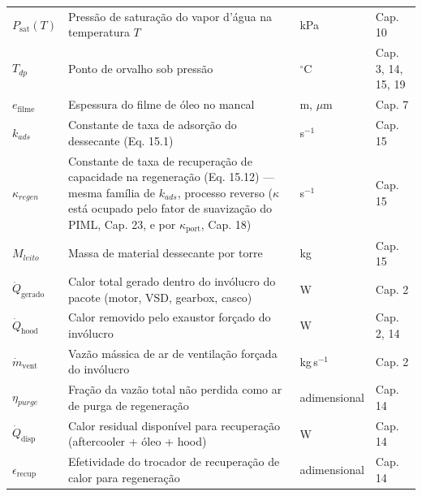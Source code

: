 \documentclass[12pt,a4paper]{article}
\numberwithin{equation}{section}
\numberwithin{table}{section}
\numberwithin{figure}{section}
\begin{document}
{\begin{longtable}{>{\raggedright\arraybackslash}p{2.8cm} >{\raggedright\arraybackslash}p{5.3cm} >{\raggedright\arraybackslash}p{2.1cm} >{\raggedright\arraybackslash}p{4.2cm}}
	$P_{\text{sat}}(T)$ & Pressão de saturação do vapor d'água na temperatura $T$ & kPa & Cap. 10 \\
	$T_{dp}$ & Ponto de orvalho sob pressão & $^{\circ}$C & Cap. 3, 14, 15, 19 \\
	$e_{\text{filme}}$\dag & Espessura do filme de óleo no mancal & m, $\mu$m & Cap. 7 \\
	$k_{ads}$\dag & Constante de taxa de adsorção do dessecante (Eq. 15.1) & s$^{-1}$ & Cap. 15 \\
	$\kappa_{regen}$\dag & Constante de taxa de recuperação de capacidade na regeneração (Eq. 15.12) — mesma família de $k_{ads}$, processo reverso ($\kappa$ está ocupado pelo fator de suavização do PIML, Cap. 23, e por $\kappa_{\text{port}}$, Cap. 18) & s$^{-1}$ & Cap. 15 \\
	$M_{leito}$ & Massa de material dessecante por torre & kg & Cap. 15 \\
	$\dot{Q}_{\text{gerado}}$ & Calor total gerado dentro do invólucro do pacote (motor, VSD, gearbox, casco) & W & Cap. 2 \\
	$\dot{Q}_{\text{hood}}$ & Calor removido pelo exaustor forçado do invólucro & W & Cap. 2, 14 \\
	$\dot{m}_{\text{vent}}$ & Vazão mássica de ar de ventilação forçada do invólucro & kg\,s$^{-1}$ & Cap. 2 \\
	$\eta_{purge}$ & Fração da vazão total não perdida como ar de purga de regeneração & adimensional & Cap. 14 \\
	$\dot{Q}_{\text{disp}}$ & Calor residual disponível para recuperação (aftercooler + óleo + hood) & W & Cap. 14 \\
	$\epsilon_{\text{recup}}$ & Efetividade do trocador de recuperação de calor para regeneração & adimensional & Cap. 14 \\ \bottomrule
\end{longtable}

}
\end{document}

